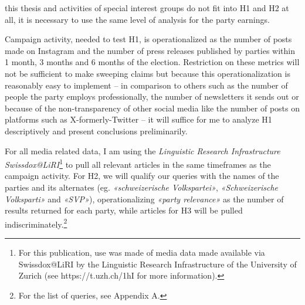 \documentclass[11pt,a4paper]{article}
\begin{document}
this thesis and activities of special interest groups do not fit into H1 and H2 at all, it is necessary to use the same level of analysis for the party earnings.

Campaign activity, needed to test H1, is operationalized as the number of posts made on Instagram and the number of press releases published by parties within 1 month, 3 months and 6 months of the election. Restriction on these metrics will not be sufficient to make sweeping claims but because this operationalization is reasonably easy to implement – in comparison to others such as the number of people the party employs professionally, the number of newsletters it sends out or because of the non-transparency of other social media like the number of posts on platforms such as X-formerly-Twitter – it will suffice for me to analyze H1 descriptively and present conclusions preliminarily.

For all media related data, I am using the \textit{Linguistic Research Infrastructure Swissdox@LiRI}\footnote{For this publication, use was made of media data made available via Swissdox@LiRI by the Linguistic Research Infrastructure of the University of Zurich (see https://t.uzh.ch/1hI for more information).} to pull all relevant articles in the same timeframes as the campaign activity. For H2, we will qualify our queries with the names of the parties and its alternates (eg. \textit{«schweizerische Volkspartei»}, \textit{«Schweizerische Volksparti»} and \textit{«SVP»}), operationalizing \textit{«party relevance»} as the number of results returned for each party, while articles for H3 will be pulled indiscriminately.\footnote{For the list of queries, see Appendix A.}
\end{document}
